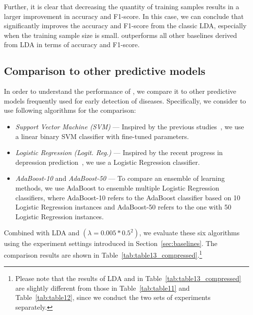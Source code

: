 Further, it is clear that decreasing the quantity of training samples results in a larger improvement in accuracy and F1-score. 
In this case, we can conclude that \TheName{} significantly improves the accuracy and F1-score from the classic LDA, especially when the training sample size is small. 
\TheName{} outperforms all other baselines derived from LDA in terms of accuracy and F1-score. 



\subsection{Comparison to other predictive models}
In order to understand the performance of \TheName{}, we compare it to other predictive models frequently used for early detection of diseases. 
Specifically, we consider to use following algorithms for the comparison:
\begin{itemize}
\item \emph{Support Vector Machine (SVM)} ---  Inspired by the previous studies~\cite{sun2012supervised,personalized2015,zhang_mseq_2015}, we use a linear binary SVM classifier with fine-tuned parameters.
\item \emph{Logistic Regression (Logit. Reg.)} --- Inspired by the recent progress in depression prediction~\cite{huang2014toward},  we use a Logistic Regression classifier.
\item \emph{AdaBoost-10} and \emph{AdaBoost-50} --- To compare an ensemble of learning methods, we use AdaBoost to ensemble multiple Logistic Regression classifiers, where AdaBoost-10 refers to the AdaBoost classifier based on 10 Logistic Regression instances and AdaBoost-50 refers to the one with 50 Logistic Regression instances.
\end{itemize}
Combined with LDA and \TheName{} $(\lambda=0.005*0.5^2)$, we evaluate these six algorithms using the experiment settings introduced in Section~\ref{sec:baselines}. 
The comparison results are shown in Table~\ref{tab:table13_compressed}.\footnote{Please note that the results of LDA and \TheName{} in Table~\ref{tab:table13_compressed} are slightly different from those in Table~\ref{tab:table11} and Table~\ref{tab:table12}, since we conduct the two sets of experiments separately.}  

	
